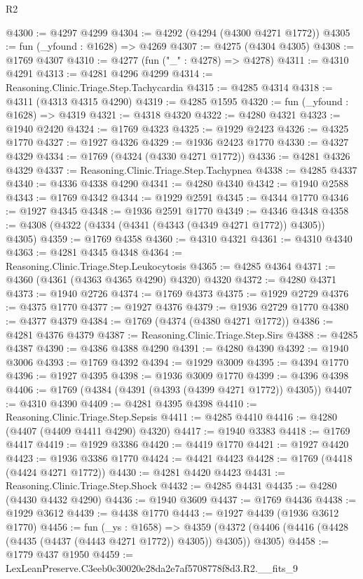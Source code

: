 \begin{lexlean}{R2}
\begin{coremodule}
@4300 := @4297 @4299
@4304 := @4292 (@4294 (@4300 @4271 @1772))
@4305 := fun (_yfound : @1628) => @4269
@4307 := @4275 (@4304 @4305)
@4308 := @1769 @4307
@4310 := @4277 (fun ("_" : @4278) => @4278)
@4311 := @4310 @4291
@4313 := @4281 @4296 @4299
@4314 := Reasoning.Clinic.Triage.Step.Tachycardia
@4315 := @4285 @4314
@4318 := @4311 (@4313 @4315 @4290)
@4319 := @4285 @1595
@4320 := fun (_yfound : @1628) => @4319
@4321 := @4318 @4320
@4322 := @4280 @4321
@4323 := @1940 @2420
@4324 := @1769 @4323
@4325 := @1929 @2423
@4326 := @4325 @1770
@4327 := @1927 @4326
@4329 := @1936 @2423 @1770
@4330 := @4327 @4329
@4334 := @1769 (@4324 (@4330 @4271 @1772))
@4336 := @4281 @4326 @4329
@4337 := Reasoning.Clinic.Triage.Step.Tachypnea
@4338 := @4285 @4337
@4340 := @4336 @4338 @4290
@4341 := @4280 @4340
@4342 := @1940 @2588
@4343 := @1769 @4342
@4344 := @1929 @2591
@4345 := @4344 @1770
@4346 := @1927 @4345
@4348 := @1936 @2591 @1770
@4349 := @4346 @4348
@4358 := @4308 (@4322 (@4334 (@4341 (@4343 (@4349 @4271 @1772)) @4305)) @4305)
@4359 := @1769 @4358
@4360 := @4310 @4321
@4361 := @4310 @4340
@4363 := @4281 @4345 @4348
@4364 := Reasoning.Clinic.Triage.Step.Leukocytosis
@4365 := @4285 @4364
@4371 := @4360 (@4361 (@4363 @4365 @4290) @4320) @4320
@4372 := @4280 @4371
@4373 := @1940 @2726
@4374 := @1769 @4373
@4375 := @1929 @2729
@4376 := @4375 @1770
@4377 := @1927 @4376
@4379 := @1936 @2729 @1770
@4380 := @4377 @4379
@4384 := @1769 (@4374 (@4380 @4271 @1772))
@4386 := @4281 @4376 @4379
@4387 := Reasoning.Clinic.Triage.Step.Sirs
@4388 := @4285 @4387
@4390 := @4386 @4388 @4290
@4391 := @4280 @4390
@4392 := @1940 @3006
@4393 := @1769 @4392
@4394 := @1929 @3009
@4395 := @4394 @1770
@4396 := @1927 @4395
@4398 := @1936 @3009 @1770
@4399 := @4396 @4398
@4406 := @1769 (@4384 (@4391 (@4393 (@4399 @4271 @1772)) @4305))
@4407 := @4310 @4390
@4409 := @4281 @4395 @4398
@4410 := Reasoning.Clinic.Triage.Step.Sepsis
@4411 := @4285 @4410
@4416 := @4280 (@4407 (@4409 @4411 @4290) @4320)
@4417 := @1940 @3383
@4418 := @1769 @4417
@4419 := @1929 @3386
@4420 := @4419 @1770
@4421 := @1927 @4420
@4423 := @1936 @3386 @1770
@4424 := @4421 @4423
@4428 := @1769 (@4418 (@4424 @4271 @1772))
@4430 := @4281 @4420 @4423
@4431 := Reasoning.Clinic.Triage.Step.Shock
@4432 := @4285 @4431
@4435 := @4280 (@4430 @4432 @4290)
@4436 := @1940 @3609
@4437 := @1769 @4436
@4438 := @1929 @3612
@4439 := @4438 @1770
@4443 := @1927 @4439 (@1936 @3612 @1770)
@4456 := fun (_ys : @1658) =>
  @4359 (@4372 (@4406 (@4416 (@4428 (@4435 (@4437 (@4443 @4271 @1772)) @4305)) @4305)) @4305)
@4458 := @1779 @437 @1950
@4459 := LexLeanPreserve.C3eeb0c30020e28da2e7af5708778f8d3.R2.__fits_9

\end{coremodule}
\end{lexlean}
